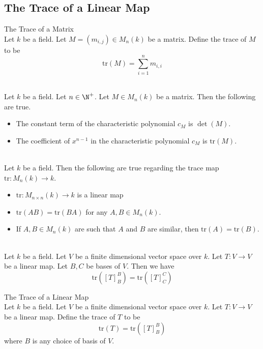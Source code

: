 \documentclass[a4paper]{article}
\begin{document}
\subsection{The Trace of a Linear Map}
\begin{defn}{The Trace of a Matrix}{}\\
Let $k$ be a field. Let $M=(m_{i,j})\in M_n(k)$ be a matrix. Define the trace of $M$ to be $$\text{tr}(M)=\sum_{i=1}^nm_{i,i}$$
\end{defn}

\begin{prp}{}{}\\
Let $k$ be a field. Let $n\in\N^+$. Let $M\in M_n(k)$ be a matrix. Then the following are true. 
\begin{itemize}
\item The constant term of the characteristic polynomial $c_M$ is $\det(M)$. 
\item The coefficient of $x^{n-1}$ in the characteristic polynomial $c_M$ is $\text{tr}(M)$. 
\end{itemize}
\end{prp}

\begin{lmm}{}{}\\
Let $k$ be a field. Then the following are true regarding the trace map $\text{tr}:M_n(k)\to k$. 
\begin{itemize}
\item $\text{tr}:M_{n\times n}(k)\to k$ is a linear map
\item $\text{tr}(AB)=\text{tr}(BA)$ for any $A,B\in M_n(k)$. 
\item If $A,B\in M_n(k)$ are such that $A$ and $B$ are similar, then $\text{tr}(A)=\text{tr}(B)$. 
\end{itemize}
\end{lmm}

\begin{lmm}{}{}\\
Let $k$ be a field. Let $V$ be a finite dimensional vector space over $k$. Let $T:V\to V$ be a linear map. Let $B,C$ be bases of $V$. Then we have $$\text{tr}([T]_B^B)=\text{tr}([T]_C^C)$$
\end{lmm}

\begin{defn}{The Trace of a Linear Map}{} \\
Let $k$ be a field. Let $V$ be a finite dimensional vector space over $k$. Let $T:V\to V$ be a linear map. Define the trace of $T$ to be $$\text{tr}(T)=\text{tr}([T]_B^B)$$ where $B$ is any choice of basis of $V$. 
\end{defn}
\end{document}
